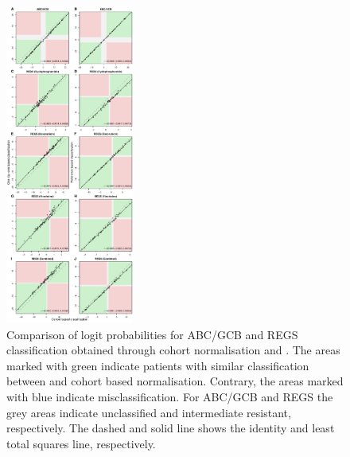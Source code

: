 \documentclass{article}
\begin{document}


\begin{figure}
\begin{center}
\includegraphics[width=0.375\textwidth]{figures/figure2.pdf}
\end{center}
\caption{Comparison of logit probabilities for ABC/GCB and REGS classification obtained through cohort normalisation and \hemaClass{}.
The areas marked with green indicate patients with similar classification between \hemaClass{} and cohort based normalisation.
Contrary, the areas marked with blue indicate misclassification.
For ABC/GCB and REGS the grey areas indicate unclassified and intermediate resistant, respectively.
The dashed and solid line shows the identity and least total squares line, respectively.}
\label{fig:ABCGCBDrug}
\end{figure}
\end{document}
